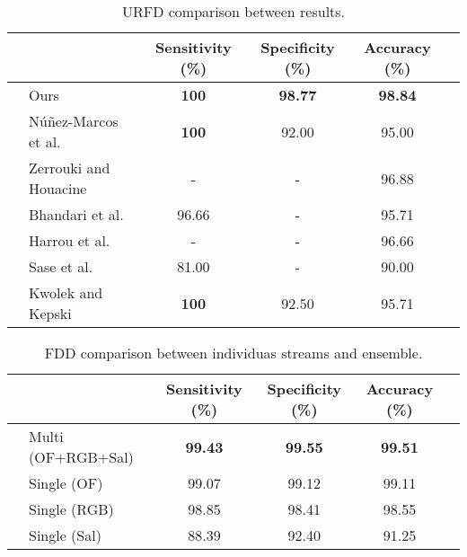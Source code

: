 \documentclass[conference]{IEEEtran}
\begin{document}
\begin{table*}[t]
\centering
\caption{URFD comparison between results.}
\label{tab:urfd-our-their}
\begin{tabular}{llcccl}
\hline
 &                              & Sensitivity (\%) & Specificity (\%) & Accuracy (\%)  &  \\ \hline
 & Ours                         & \textbf{100}      & \textbf{98.77}   & \textbf{98.84} &  \\
 & N\'u\~nez-Marcos et al.~\cite{nunez2017vision}      & \textbf{100}      & 92.00            & 95.00          &  \\
 & Zerrouki and Houacine~\cite{zerrouki2018vision}  & -                & -                & 96.88          &  \\
 & Bhandari et al.~\cite{bhandari2017novel}  & 96.66                & -                & 95.71          &  \\
 & Harrou et al.~\cite{harrou2017vision}  & -                & -                & 96.66          &  \\
 & Sase et al.~\cite{sase2018human}  & 81.00                & -                & 90.00          &  \\
 & Kwolek and Kepski~\cite{kepski2014human}            & \textbf{100}     & 92.50            & 95.71          &  \\ \hline
\end{tabular}
\end{table*}

\begin{table*}[t]
\centering
\caption{FDD comparison between individuas streams and ensemble.}
\label{tab:fdd-ensem}
\begin{tabular}{llcccl}
\hline
 &                      & Sensitivity (\%)  & Specificity (\%)  & Accuracy (\%)     &  \\ \hline
 & Multi (OF+RGB+Sal)   & \textbf{99.43}    & \textbf{99.55}    & \textbf{99.51}    &  \\
 & Single (OF)          & 99.07             & 99.12             & 99.11             &  \\
 & Single (RGB)         & 98.85             & 98.41             & 98.55             &  \\
 & Single (Sal)         & 88.39             & 92.40             & 91.25             & \\ \hline
\end{tabular}
\end{table*}
\end{document}
